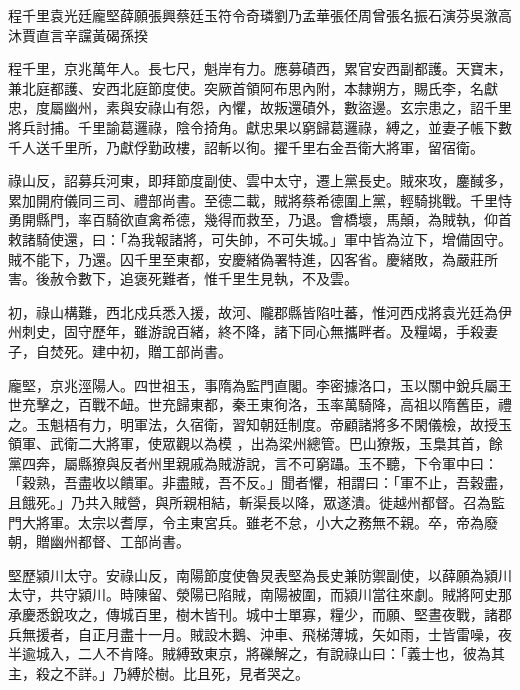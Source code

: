 
\begin{pinyinscope}

 程千里袁光廷龐堅薛願張興蔡廷玉符令奇璘劉乃孟華張伾周曾張名振石演芬吳漵高沐賈直言辛讜黃碣孫揆



 程千里，京兆萬年人。長七尺，魁岸有力。應募磧西，累官安西副都護。天寶末，兼北庭都護、安西北庭節度使。突厥首領阿布思內附，本隸朔方，賜氏李，名獻忠，度屬幽州，素與安祿山有怨，內懼，故叛還磧外，數盜邊。玄宗患之，詔千里將兵討捕。千里諭葛邏祿，陰令掎角。獻忠果以窮歸葛邏祿，縛之，並妻子帳下數千人送千里所，乃獻俘勤政樓，詔斬以徇。擢千里右金吾衛大將軍，留宿衛。



 祿山反，詔募兵河東，即拜節度副使、雲中太守，遷上黨長史。賊來攻，鏖馘多，累加開府儀同三司、禮部尚書。至德二載，賊將蔡希德圍上黨，輕騎挑戰。千里恃勇開縣門，率百騎欲直禽希德，幾得而救至，乃退。會橋壞，馬顛，為賊執，仰首敕諸騎使還，曰：「為我報諸將，可失帥，不可失城。」軍中皆為泣下，增備固守。賊不能下，乃還。囚千里至東都，安慶緒偽署特進，囚客省。慶緒敗，為嚴莊所害。後赦令數下，追褒死難者，惟千里生見執，不及雲。



 初，祿山構難，西北戍兵悉入援，故河、隴郡縣皆陷吐蕃，惟河西戍將袁光廷為伊州刺史，固守歷年，雖游說百緒，終不降，諸下同心無攜畔者。及糧竭，手殺妻子，自焚死。建中初，贈工部尚書。


龐堅，京兆涇陽人。四世祖玉，事隋為監門直閣。李密據洛口，玉以關中銳兵屬王世充擊之，百戰不衄。世充歸東都，秦王東徇洛，玉率萬騎降，高祖以隋舊臣，禮之。玉魁梧有力，明軍法，久宿衛，習知朝廷制度。帝顧諸將多不閑儀檢，故授玉領軍、武衛二大將軍，使眾觀以為模
 ，出為梁州總管。巴山獠叛，玉梟其首，餘黨四奔，屬縣獠與反者州里親戚為賊游說，言不可窮躡。玉不聽，下令軍中曰：「穀熟，吾盡收以饋軍。非盡賊，吾不反。」聞者懼，相謂曰：「軍不止，吾穀盡，且餓死。」乃共入賊營，與所親相結，斬渠長以降，眾遂潰。徙越州都督。召為監門大將軍。太宗以耆厚，令主東宮兵。雖老不怠，小大之務無不親。卒，帝為廢朝，贈幽州都督、工部尚書。



 堅歷潁川太守。安祿山反，南陽節度使魯炅表堅為長史兼防禦副使，以薛願為潁川太守，共守潁川。時陳留、滎陽已陷賊，南陽被圍，而潁川當往來劇。賊將阿史那承慶悉銳攻之，傳城百里，樹木皆刊。城中士單寡，糧少，而願、堅晝夜戰，諸郡兵無援者，自正月盡十一月。賊設木鵝、沖車、飛梯薄城，矢如雨，士皆雷噪，夜半逾城入，二人不肯降。賊縛致東京，將礫解之，有說祿山曰：「義士也，彼為其主，殺之不詳。」乃縛於樹。比且死，見者哭之。




\end{pinyinscope}
